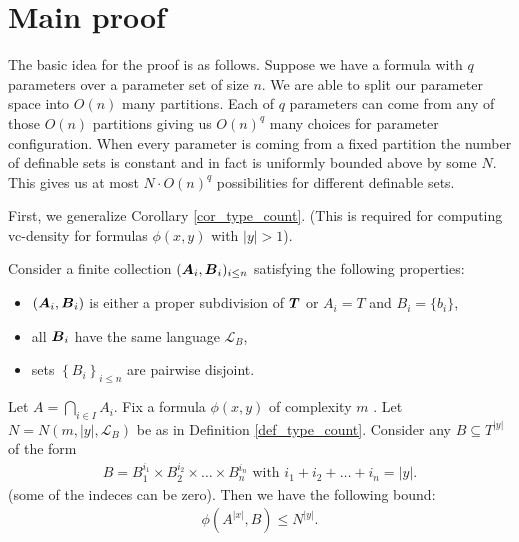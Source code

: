 \documentclass{amsart}
\DeclareMathOperator{\TT}{\boldface T}
\DeclareMathOperator{\A}{\boldface A}
\DeclareMathOperator{\B}{\boldface B}
\renewcommand{\LL}{\mathcal L}
\newcommand{\curly}[1]{\left\{#1\right\}}
\begin{document}
\section{Main proof}

The basic idea for the proof is as follows.
Suppose we have a formula with $q$ parameters over a parameter set of size $n$.
We are able to split our parameter space into $O(n)$ many partitions. Each of $q$ parameters can come from any of those $O(n)$ partitions giving us $O(n)^q$ many choices for parameter configuration. When every parameter is coming from a fixed partition the number of definable sets is constant and in fact is uniformly bounded above by some $N$. This gives us at most $N \cdot O(n)^q$ possibilities for different definable sets.

First, we generalize Corollary \ref{cor_type_count}. (This is required for computing vc-density for formulas $\phi(x, y)$ with $|y| > 1$).

\begin{Lemma} \label{lm_partition_bound}
  Consider a finite collection $(\A_i, \B_i)_{i \leq n}$ satisfying the following properties:
  \begin{itemize}
  \item $(\A_i, \B_i)$ is either a proper subdivision of $\TT$ or $A_i = T$ and $B_i = \{b_i\}$,
  \item all $\B_i$ have the same language $\LL_B$,
  \item sets $\curly{B_i}_{i \leq n}$ are pairwise disjoint.
  \end{itemize}
  Let $A = \bigcap_{i \in I} A_i$.
  Fix a formula $\phi(x, y)$ of complexity $m$ . Let $N = N(m, |y|, \LL_B)$ be as in Definition \ref{def_type_count}. Consider any $B \subseteq T^{|y|}$ of the form
  \begin{align*}
    B = B_1^{i_1} \times B_2^{i_2} \times \ldots \times B_n^{i_n} \text { with } i_1 + i_2 + \ldots + i_n = |y|.
  \end{align*}
  (some of the indeces can be zero). Then we have the following bound:
  \begin{align*}
    \phi(A^{|x|}, B) \leq N^{|y|}.
  \end{align*}
\end{Lemma}
\end{document}
